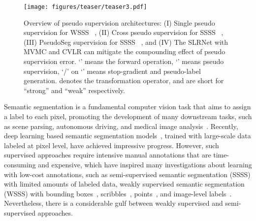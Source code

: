 \documentclass[twocolumn]{svjour3}          \smartqed  \usepackage{graphicx}
\begin{document}
\begin{figure}[!t]
   \centering
  \def\svgwidth{\linewidth}
    \texttt{[image: figures/teaser/teaser3.pdf]}
  \vspace{-0.5cm}
  \caption{
    Overview of pseudo supervision architectures: (I) Single pseudo supervision for WSSS ~\citep{Araslanov020:SingleStage}, (II) Cross pseudo supervision for SSSS ~\citep{Chen2021:CrossPseudo}, (III) PseudoSeg supervision for SSSS ~\citep{zou2020:pseudoseg}, and (IV) The SLRNet with MVMC and CVLR can mitigate the compounding effect of pseudo supervision error. `' means the forward operation, `' means pseudo supervision,  `/' on `' means stop-gradient and pseudo-label generation.  denotes the transformation operator,  and  are short for ``strong'' and ``weak'' respectively. 
  }
   \vspace{-1em}
  \label{fig:overview}
\end{figure}

Semantic segmentation is a fundamental computer vision task that aims to assign a label to each pixel, promoting the development of many downstream tasks, such as scene parsing, autonomous driving, and medical image analysis~\citep{deeplabv3plus2018,ZhouZPXFBT19:ADE20K,HavaeiDWBCBPJL17:BrainTumor}.
Recently, deep learning based semantic segmentation models~\citep{LongSD15:FCN,deeplabv3plus2018}, trained with large-scale data labeled at pixel level, have achieved impressive progress.
However, such supervised approaches require intensive manual annotations that are time-consuming and expensive, which have inspired many investigations about learning with low-cost annotations,
such as semi-supervised semantic segmentation (SSSS) with limited amounts of labeled data, weakly supervised semantic segmentation (WSSS) with bounding boxes~\citep{dai2015:boxsup}, scribbles~\citep{lin2016:scribblesup}, points~\citep{bearman2016s:pointsup}, and image-level labels~\citep{KolesnikovL16:SEC}.
Nevertheless, there is a considerable gulf between weakly supervised and semi-supervised approaches.
\end{document}

